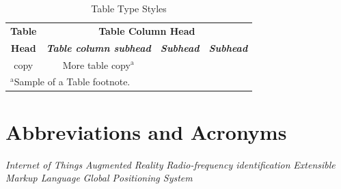 \documentclass[conference]{IEEEtran}
\begin{document}
\begin{table}[htbp]
\caption{Table Type Styles}
\begin{center}
\begin{tabular}{|c|c|c|c|}
\hline
\textbf{Table}&\multicolumn{3}{|c|}{\textbf{Table Column Head}} \\
\cline{2-4} 
\textbf{Head} & \textbf{\textit{Table column subhead}}& \textbf{\textit{Subhead}}& \textbf{\textit{Subhead}} \\
\hline
copy& More table copy$^{\mathrm{a}}$& &  \\
\hline
\multicolumn{4}{l}{$^{\mathrm{a}}$Sample of a Table footnote.}
\end{tabular}
\label{tab1}
\end{center}
\end{table}

\section*{Abbreviations and Acronyms}
\begin{acronym}[Bash]
 {\textit{Internet of Things}}
 {\textit{Augmented Reality}}
 {\textit{Radio-frequency identification}}
 {\textit{Extensible Markup Language}}
 {\textit{Global Positioning System}}
\end{acronym}

\printbibliography
\end{document}
